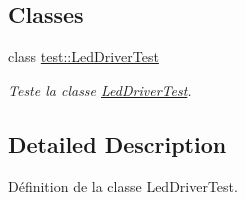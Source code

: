 \subsection*{Classes}
\begin{DoxyCompactItemize}
\item 
class \hyperlink{classtest_1_1LedDriverTest}{test\+::\+Led\+Driver\+Test}
\begin{DoxyCompactList}\small\item\em Teste la classe \hyperlink{classtest_1_1LedDriverTest}{Led\+Driver\+Test}. \end{DoxyCompactList}\end{DoxyCompactItemize}


\subsection{Detailed Description}
Définition de la classe Led\+Driver\+Test. 

